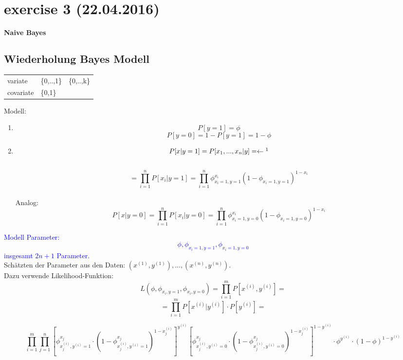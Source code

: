 \section*{exercise 3 (22.04.2016)}

\paragraph{Naive Bayes}

\subsection*{Wiederholung Bayes Modell}
\begin{tabular}{lll}
variate   & \{0,..,1\}   & \{0,..,k\}   \\
covariate & \multicolumn{2}{l}{\{0,1\}}
\end{tabular}

Modell: 
\begin{enumerate}
\item \[ P[y=1] = \phi\]  \[ P[y=0] = 1 - P[y=1] = 1 - \phi \]
\item \[ P[x|y=1] = P[x_1,...,x_n | y] = \leftarrow \footnote{hier eine naive Annahme, dass alle $x$ von einander unabhängig sind.}\]   \\
\[ = \prod_{i=1}^n P[x_i | y=1] = \prod_{i=1}^n \phi_{x_i = 1, y = 1}^{x_i} (1 - \phi_{x_i = 1, y = 1})^{1 - x_i} \] \\
Analog: \[ P[x|y=0] = \prod_{i=1}^n P[x_i | y = 0] = \prod_{i=1}^n \phi_{x_i = 1, y = 0}^{x_i} (1 - \phi_{x_i = 1, y = 0})^{1 - x_i}\]
\end{enumerate}

\textcolor{blue}{Modell Parameter: \[ \phi, \phi_{x_i = 1, y = 1} , \phi_{x_i = 1, y = 0} \] insgesamt $2n + 1$ Parameter.}\\

Schätzten der Parameter aus den Daten: $(x^{(1)},y^{(1)}),...,(x^{(n)},y^{(n)})$.\\
Dazu verwende Likelihood-Funktion: \\
\[L(\phi, \phi_{x_i,y=1}, \phi_{x_i,y=0}) = \prod_{i=1}^{m} P[x^{(i)},y^{(i)}] = \]
\[ = \prod_{i=1}^{m} P[x^{(i)}|y^{(i)}] \cdot P[y^{(i)}] = \]

\[ \prod_{i=1}^{m} \prod_{j=1}^{n} [\phi_{x_{j}^{(i)},y^{(i)}=1} ^{x_j} \cdot (1 - \phi_{x_{j}^{(i)},y^{(i)}=1}^{x_j})^{1 - x_{j}^{(i)}} ]^{y^{(i)}} [\phi_{x_{j}^{(i)},y^{(i)} =0} ^{x_j} \cdot (1 - \phi_{x_{j}^{(i)},y^{(i)}=0}^{x_j})^{1 - x_{j}^{(i)}}]^{1-y^(i)} \cdot \phi^{y^{(i)}} \cdot (1 - \phi)^{1 - y^{(i)}} \]   


